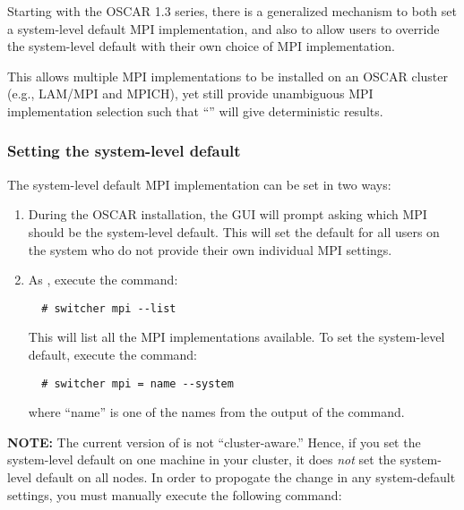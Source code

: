 %
%
%

Starting with the OSCAR 1.3 series, there is a generalized mechanism
to both set a system-level default MPI implementation, and also to
allow users to override the system-level default with their own choice
of MPI implementation.

This allows multiple MPI implementations to be installed on an OSCAR
cluster (e.g., LAM/MPI and MPICH), yet still provide unambiguous MPI
implementation selection such that ``'' will
give deterministic results.


\subsubsection{Setting the system-level default}

The system-level default MPI implementation can be set in two ways:

\begin{enumerate}
\item During the OSCAR installation, the GUI will prompt asking which
  MPI should be the system-level default.  This will set the default
  for all users on the system who do not provide their own individual
  MPI settings.
  
\item As , execute the command:

\begin{verbatim}
  # switcher mpi --list
\end{verbatim}

   This will list all the MPI implementations available.  To set the
   system-level default, execute the command:

\begin{verbatim}
  # switcher mpi = name --system
\end{verbatim}
   
   where ``name'' is one of the names from the output of the
    command.
\end{enumerate}

{\bf NOTE:} The current version of  is not
``cluster-aware.''  Hence, if you set the system-level default on one
machine in your cluster, it does {\em not} set the system-level
default on all nodes.  In order to propogate the change in any
 system-default settings, you must manually execute the
following command:

